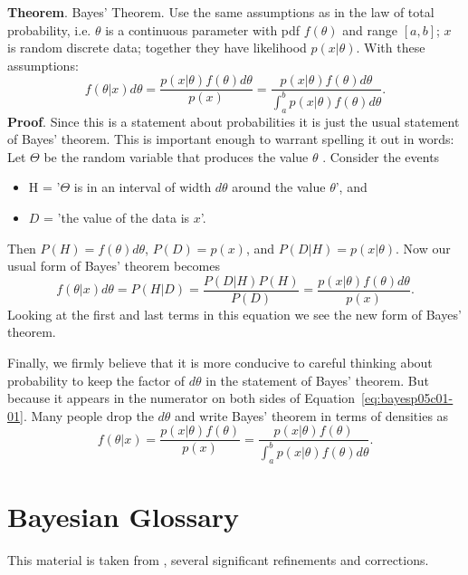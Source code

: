 \textbf{Theorem}. Bayes' Theorem. Use the same assumptions as in the law of total probability,
i.e. $\theta$  is a continuous parameter with pdf $f(\theta )$ and range $[a, b]$; $x$ is random discrete data; together they have likelihood $p(x|\theta )$. With these assumptions:
\begin{equation}
f(\theta | x) d \theta=\frac{p(x | \theta) f(\theta) d \theta}{p(x)}=\frac{p(x | \theta) f(\theta) d \theta}{\int_{a}^{b} p(x | \theta) f(\theta) d \theta}.\label{eq:bayesp05c01-01}
\end{equation}
\textbf{Proof}. Since this is a statement about probabilities it is just the usual statement of Bayes'
theorem. This is important enough to warrant spelling it out in words: Let $\Theta$  be the random
variable that produces the value $\theta$ . Consider the events
\begin{itemize}
\item 
H = '$\Theta$  is in an interval of width $d\theta$  around the value $\theta$', and 
\item 
$D$ = 'the value of the data is $x$'.
\end{itemize}
Then $P(H) = f(\theta ) d\theta$, $P(D) = p(x)$, and $P(D|H) = p(x|\theta )$. Now our usual form of Bayes' theorem becomes
\begin{equation}
f(\theta | x) d \theta=P(H | D)=\frac{P(D | H) P(H)}{P(D)}=\frac{p(x | \theta) f(\theta) d \theta}{p(x)}.\label{eq:bayesp05c01-02}
\end{equation}
Looking at the first and last terms in this equation we see the new form of Bayes' theorem.

Finally, we firmly believe that it is more conducive to careful thinking about probability
to keep the factor of $d\theta$ in the statement of Bayes' theorem. But because it appears in the
numerator on both sides of Equation~\ref{eq:bayesp05c01-01}. Many people drop the $d\theta$ and write Bayes' theorem in terms of densities as
\begin{equation}
f(\theta | x)=\frac{p(x | \theta) f(\theta)}{p(x)}=\frac{p(x | \theta) f(\theta)}{\int_{a}^{b} p(x | \theta) f(\theta) d \theta}.\label{eq:bayesp05c01-03}
\end{equation}

\section{Bayesian Glossary}
\label{sec:BayesianGlossary}

This material is taken from \cite{RavinKumarBayesianGlossary2019}, several significant refinements and corrections.

